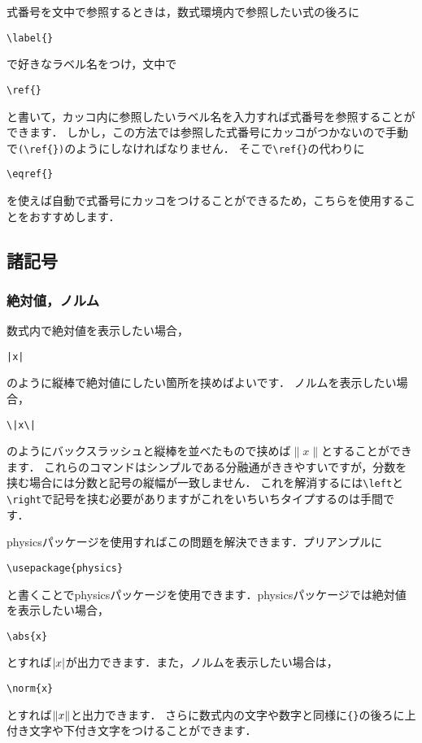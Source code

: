 \documentclass[a4paper,11pt,titlepage]{jsarticle}
\theoremstyle{definition}
\begin{document}
式番号を文中で参照するときは，数式環境内で参照したい式の後ろに
\begin{center}
    \verb|\label{}|
\end{center}
で好きなラベル名をつけ，文中で
\begin{center}
    \verb|\ref{}|
\end{center}
と書いて，カッコ内に参照したいラベル名を入力すれば式番号を参照することができます．
しかし，この方法では参照した式番号にカッコがつかないので手動で\verb|(\ref{})|のようにしなければなりません．
そこで\verb|\ref{}|の代わりに
\begin{center}
    \verb|\eqref{}|
\end{center}
を使えば自動で式番号にカッコをつけることができるため，こちらを使用することをおすすめします．

\subsection{諸記号}

\subsubsection{絶対値，ノルム}

数式内で絶対値を表示したい場合，
\begin{center}
    \verb+|x|+
\end{center}
のように縦棒で絶対値にしたい箇所を挟めばよいです．
ノルムを表示したい場合，
\begin{center}
    \verb+\|x\|+
\end{center}
のようにバックスラッシュと縦棒を並べたもので挟めば$\|x\|$とすることができます．
これらのコマンドはシンプルである分融通がききやすいですが，分数を挟む場合には分数と記号の縦幅が一致しません．
これを解消するには\verb|\left|と\verb|\right|で記号を挟む必要がありますがこれをいちいちタイプするのは手間です．

physicsパッケージを使用すればこの問題を解決できます．プリアンプルに
\begin{center}
    \verb|\usepackage{physics}|
\end{center}
と書くことでphysicsパッケージを使用できます．physicsパッケージでは絶対値を表示したい場合，
\begin{center}
    \verb|\abs{x}|
\end{center}
とすれば$\abs{x}$が出力できます．また，ノルムを表示したい場合は，
\begin{center}
    \verb|\norm{x}|
\end{center}
とすれば$\norm{x}$と出力できます．
さらに数式内の文字や数字と同様に\verb|{}|の後ろに上付き文字や下付き文字をつけることができます．
\end{document}
